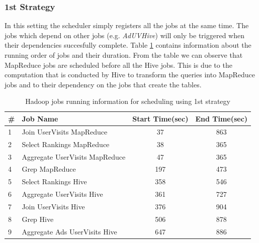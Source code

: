 \documentclass[11pt,a4paper,twoside]{report}
\begin{document}
\subsubsection{1st Strategy}
In this setting the scheduler simply registers all the jobs at the same time. The jobs which depend on other jobs (e.g. \textit{AdUVHive}) will only be triggered when their dependencies succesfully complete. Table \ref{tab:DronTest1Jobs} contains information about the running order of jobs and their duration. From the table we can observe that MapReduce jobs are scheduled before all the Hive jobs. This is due to the computation that is conducted by Hive to transform the queries into MapReduce jobs and to their dependency on the jobs that create the tables.

\begin{table}[h]
\centering
\begin{tabular}{|l|l|c|c|}
\hline
\textbf{\#} & \textbf{Job Name} & \textbf{Start Time(sec)} & \textbf{End Time(sec)} \\ \hline
1 & Join UserVisits MapReduce & 37 & 863 \\ \hline
2 & Select Rankings MapReduce & 38 & 365 \\ \hline
3 & Aggregate UserVisits MapReduce & 47 & 365 \\ \hline
4 & Grep MapReduce & 197 & 473 \\ \hline
5 & Select Rankings Hive & 358 & 546 \\ \hline 
6 & Aggregate UserVisits Hive & 361 & 727  \\ \hline
7 & Join UserVisits Hive & 376 & 904 \\ \hline
8 & Grep Hive & 506 & 878 \\ \hline
9 & Aggregate Ads UserVisits Hive & 647 & 886 \\ \hline
\end{tabular}
\caption{Hadoop jobs running information for scheduling using 1st strategy}
\label{tab:DronTest1Jobs}
\end{table}
\end{document}
